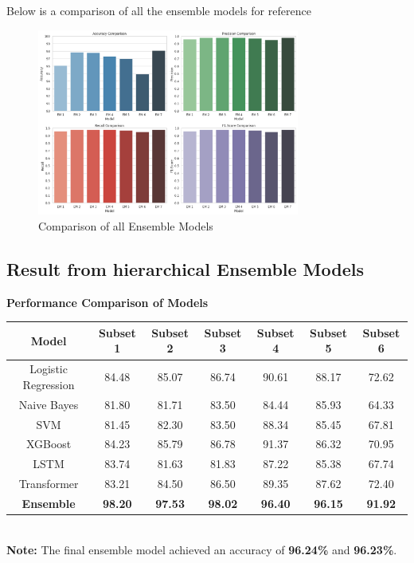 \vspace{1em}

\noindent
Below is a comparison of all the ensemble models for reference

\begin{figure}[h!]  
    \centering
    \includegraphics[width=0.77\textwidth]{Images/EM COMPARE.png}  
    \caption{Comparison of all Ensemble Models}
    \label{lstm arch}  %
\end{figure}


\pagebreak

\subsection{Result from hierarchical Ensemble Models}

\begin{center}
    \textbf{Performance Comparison of Models} \\[0.5em]
    \begin{tabular}{|c|c|c|c|c|c|c|}
        \hline
        \textbf{Model} & \textbf{Subset 1} & \textbf{Subset 2} & \textbf{Subset 3} & \textbf{Subset 4} & \textbf{Subset 5} & \textbf{Subset 6} \\ \hline
        Logistic Regression & 84.48 & 85.07 & 86.74 & 90.61 & 88.17 & 72.62 \\ \hline
        Naive Bayes         & 81.80 & 81.71 & 83.50 & 84.44 & 85.93 & 64.33 \\ \hline
        SVM                 & 81.45 & 82.30 & 83.50 & 88.34 & 85.45 & 67.81 \\ \hline
        XGBoost             & 84.23 & 85.79 & 86.78 & 91.37 & 86.32 & 70.95 \\ \hline
        LSTM                & 83.74 & 81.63 & 81.83 & 87.22 & 85.38 & 67.74 \\ \hline
        Transformer         & 83.21 & 84.50 & 86.50 & 89.35 & 87.62 & 72.40 \\ \hline
        \textbf{Ensemble}   & \textbf{98.20} & \textbf{97.53} & \textbf{98.02} & \textbf{96.40} & \textbf{96.15} & \textbf{91.92} \\ \hline
    \end{tabular} \\[1em]
    \textbf{Note:} The final ensemble model achieved an accuracy of \textbf{96.24\%} and \textbf{96.23\%}.
\end{center}

